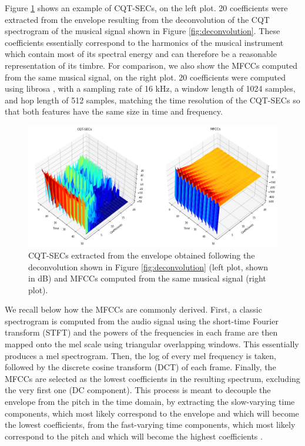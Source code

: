 \documentclass[journal]{IEEEtran}
\begin{document}
Figure \ref{fig:extraction} shows an example of CQT-SECs, on the left plot. 20 coefficients were extracted from the envelope resulting from the deconvolution of the CQT spectrogram of the musical signal shown in Figure \ref{fig:deconvolution}. These coefficients essentially correspond to the harmonics of the musical instrument which contain most of its spectral energy and can therefore be a reasonable representation of its timbre. For comparison, we also show the MFCCs computed from the same musical signal, on the right plot. 20 coefficients were computed using librosa \cite{mcfee2015}, with a sampling rate of 16 kHz, a window length of 1024 samples, and hop length of 512 samples, matching the time resolution of the CQT-SECs so that both features have the same size in time and frequency. 

\begin{figure}[htp]
    \centering
    \includegraphics[width=\textwidth]{extraction.png}
    \caption{CQT-SECs extracted from the envelope obtained following the deconvolution shown in Figure \ref{fig:deconvolution} (left plot, shown in dB) and MFCCs computed from the same musical signal (right plot).}
    \label{fig:extraction}
\end{figure}

We recall below how the MFCCs are commonly derived. First, a classic spectrogram is computed from the audio signal using the short-time Fourier transform (STFT) and the powers of the frequencies in each frame are then mapped onto the mel scale \cite{stevens1937} using triangular overlapping windows. This essentially produces a mel spectrogram. Then, the log of every mel frequency is taken, followed by the discrete cosine transform (DCT) of each frame. Finally, the MFCCs are selected as the lowest coefficients in the resulting spectrum, excluding the very first one (DC component). This process is meant to decouple the envelope from the pitch in the time domain, by extracting the slow-varying time components, which most likely correspond to the envelope and which will become the lowest coefficients, from the fast-varying time components, which most likely correspond to the pitch and which will become the highest coefficients \cite{mermelstein1976}. 
\end{document}
